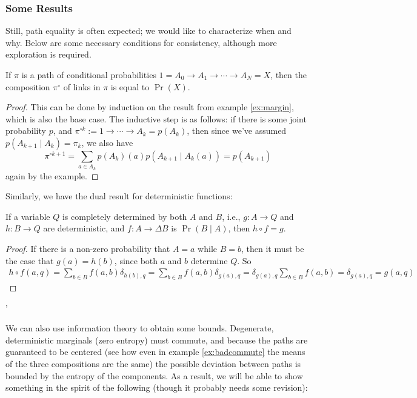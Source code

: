 \documentclass{article}
\begin{document}
	\subsubsection{Some Results} \label{sec:commute-results}
	Still, path equality is often expected; we would like to characterize when and why. Below are some necessary conditions for consistency, although more exploration is required.
	
	\begin{prop}\label{prop:prob-eq}
		If $\pi$ is a path of conditional probabilities $1 = A_0 \to A_1\to\cdots \to A_N = X$, then the composition $\pi^\circ$ of links in $\pi$ is equal to $\Pr(X)$.
	\end{prop}
	\begin{proof}
		This can be done by induction on the result from example \ref{ex:margin}, which is also the base case. The inductive step is as follows: if there is some joint probability $p$, and $\pi^{\circ k} := 1 \to \cdots \to A_k = p(A_k)$, then since we've assumed $p(A_{k+1} \mid A_k) = \pi_k$, we also have 
		\[ \pi^{\circ k+1} = \sum_{a \in A_k} p(A_k)(a) p(A_{k+1} \mid A_k(a)) = p(A_{k+1}) \] again by the example.
	\end{proof}

	Similarly, we have the dual result for deterministic functions:
	\begin{prop}\label{prop:det-eq}
		If a variable $Q$ is completely determined by both $A$ and $B$, i.e., $g : A\to Q$ and $h : B\to Q$ are deterministic, and $f : A \to \Delta B$ is $\Pr(B \mid A)$, then $h \circ f = g$. 
	\end{prop}
	\begin{proof}
		If there is a non-zero probability that $A = a$ while $B = b$, then it must be the case that $g(a) = h(b)$, since both $a$ and $b$ determine $Q$. So
		\begin{align*}
			h \circ f(a,q) = \sum_{b \in B} f(a,b) \delta_{h(b),q}	
					= \sum_{b \in B} f(a,b) \delta_{g(a), q} 
					= \delta_{g(a),q} \sum_{b \in B} f(a,b) 
					= \delta_{g(a),q} 
					= g(a, q)
		\end{align*}
	\end{proof}'

	We can also use information theory to obtain some bounds. Degenerate, deterministic marginals (zero entropy) must commute, and because the paths are guaranteed to be centered (see how even in example \ref{ex:badcommute} the means of the three compositions are the same) the possible deviation between paths is bounded by the entropy of the components. As a result, we will be able to show something in the spirit of the following (though it probably needs some revision):
\end{document}
